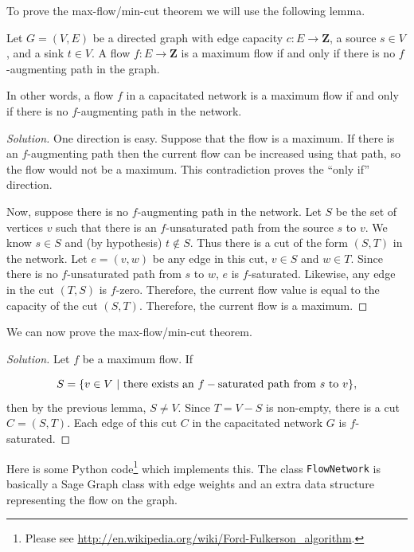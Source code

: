 To prove the max-flow/min-cut theorem we will use the following lemma.

\begin{lemma}
{\rm
Let $G=(V,E)$ be a directed graph with edge 
capacity $c:E\to {\mathbf{Z}}$,
a source $s\in V$, and a sink $t\in V$.
A flow $f:E\to {\mathbf{Z}}$ is a maximum flow if 
and only if there is no $f$-augmenting path in the graph.
}
\end{lemma}

In other words, a flow $f$ in a 
capacitated network is a maximum flow if and only if
there is no $f$-augmenting path in the network.

\begin{proof}[Solution]
One direction is easy. Suppose that the flow is a maximum.
If there is an $f$-augmenting path then the 
current flow can be increased using that path, so the flow would not 
be a maximum. This contradiction proves the ``only if'' direction.

Now, suppose there is no $f$-augmenting path in the network.
Let $S$ be the set of vertices $v$ such that there is an $f$-unsaturated path from
the source $s$ to $v$. We know $s\in S$ and (by hypothesis)
$t\notin S$. Thus there is a cut of the form $(S,T)$ in the network.
Let $e=(v,w)$ be any edge in this cut, $v\in S$ and $w\in T$. Since
there is no $f$-unsaturated path from $s$ to $w$,
$e$ is $f$-saturated. Likewise, any edge in the cut
$(T,S)$ is $f$-zero. Therefore, the current flow value is equal to the
capacity of the cut $(S,T)$. Therefore, the current flow is a maximum.
\end{proof}

We can now prove the max-flow/min-cut theorem.

\begin{proof}[Solution]
Let $f$ be a maximum flow.
If

\[
S = \{v\in V\ |\ {\rm there\ exists\ an\ }f-{\rm saturated\ path\
  from\ }s\ {\rm to\ }v\},
\]
then by the previous lemma, $S\not= V$.
Since $T=V-S$ is non-empty, there is a cut $C=(S,T)$.
Each edge of this cut $C$ in the capacitated network $G$ is
$f$-saturated.

\end{proof}

Here is some Python code\footnote{Please see
\url{http://en.wikipedia.org/wiki/Ford-Fulkerson_algorithm}.}
which implements this. The class {\tt FlowNetwork} is basically a Sage
Graph class with edge weights and an extra data structure representing
the flow on the graph.

